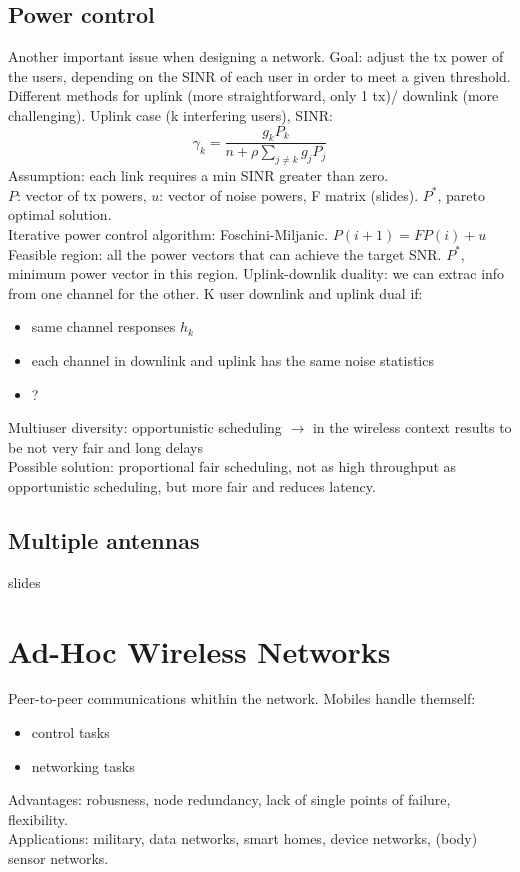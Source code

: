 \section{Power control}
Another important issue when designing a network. Goal: adjust the tx power of the users, depending on the SINR of each user in order to meet a given threshold. Different methods for uplink (more straightforward, only 1 tx)/ downlink (more challenging).
Uplink case (k interfering users), SINR: $$\gamma_k = \frac{g_kP_k}{n + \rho \sum_{j \neq k} g_jP_j}$$
Assumption: each link requires a min SINR greater than zero. \\
$P$: vector of tx powers, $u$: vector of noise powers, F matrix (slides). $P^*$, pareto optimal solution. \\
Iterative power control algorithm: Foschini-Miljanic. $P(i+1) = FP(i) + u$ \\
Feasible region: all the power vectors that can achieve the target SNR. $P^*$, minimum power vector in this region.
Uplink-downlik duality: we can extrac info from one channel for the other. K user downlink and uplink dual if:
\begin{itemize}
  \item same channel responses $h_k$
  \item each channel in downlink and uplink has the same noise statistics
  \item ?
\end{itemize}
Multiuser diversity: opportunistic scheduling $\rightarrow$ in the wireless context results to be not very fair and long delays\\
Possible solution: proportional fair scheduling, not as high throughput as opportunistic scheduling, but more fair and reduces latency.
\section{Multiple antennas}
slides

\chapter{Ad-Hoc Wireless Networks}
Peer-to-peer communications whithin the network. Mobiles handle themself: \begin{itemize} \item control tasks \item networking tasks \end{itemize}
Advantages: robusness, node redundancy, lack of single points of failure, flexibility. \\
Applications: military, data networks, smart homes, device networks, (body) sensor networks. \\
